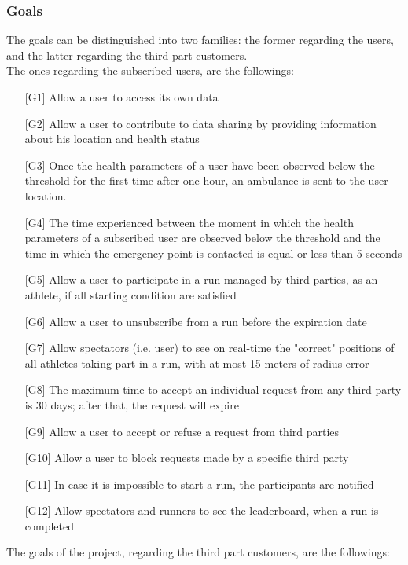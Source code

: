 \subsubsection{Goals}
The goals can be distinguished into two families: the former regarding the users, and the latter regarding the third part customers.\\
The ones regarding the subscribed users, are the followings:
\begin{enumerate}
\item[{[G1]}] Allow a user to access its own data
\item[{[G2]}] Allow a user to contribute to data sharing by providing information about his location and health status
\item[{[G3]}] Once the health parameters of a user have been observed 
below the threshold for the first time after one hour, an ambulance is sent to the user location. 
\item[{[G4]}] The time experienced between the moment in which the health parameters of a subscribed user are observed below the threshold and the time in which the emergency point is contacted is equal or less than 5 seconds
\item[{[G5]}] Allow a user to participate in a run managed by third parties, as an athlete, if all starting condition are satisfied
\item[{[G6]}] Allow a user to unsubscribe from a run before the expiration date
\item[{[G7]}] Allow spectators (i.e. user) to see on real-time the "correct" positions of all athletes taking part in a run, with at most 15 meters of radius error
\item[{[G8]}] The maximum time to accept an individual request from any third party is 30 days; after that, the request will expire
\item[{[G9]}] Allow a user to accept or refuse a request from third parties
\item[{[G10]}] Allow a user to block requests made by a specific third party
\item[{[G11]}] In case it is impossible to start a run, the participants are notified
\item[{[G12]}] Allow spectators and runners to see the leaderboard, when a run is completed
\end{enumerate}
The goals of the project, regarding the third part customers, are the followings:
